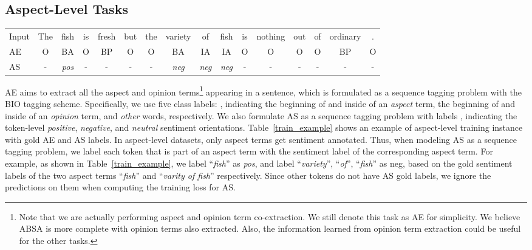 \documentclass[11pt,a4paper]{article}
\begin{document}
\subsection{Aspect-Level Tasks}

\begin{table*}[t!]
\centering
\small
\begin{tabular}{lccccccccccccccc}
\toprule 
Input &The &fish &is &fresh &but &the &variety &of &fish &is &nothing &out &of &ordinary &.\\
AE &O &BA &O &BP &O &O &BA &IA &IA &O &O &O &O &BP &O\\
AS &- &\emph{pos} &- &- &- &- &\emph{neg} &\emph{neg} &\emph{neg} &- &- &- &- &- &-\\
\bottomrule
\end{tabular}
\caption{An aspect-level training instance with gold AE and AS labels.}\label{train_example}
\end{table*}

AE aims to extract all the aspect and opinion terms\footnote{Note that we are actually performing aspect and opinion term co-extraction. We still denote this task as AE for simplicity. 
We believe ABSA is more complete with opinion terms also extracted. Also, the information learned from opinion term extraction could be useful for the other tasks.} 
appearing in a sentence, which is formulated as a sequence tagging problem with the BIO tagging scheme. Specifically, we use five class labels: , indicating the beginning of and inside of an \emph{aspect} term, the beginning of and inside of an \emph{opinion} term, and \emph{other} words, respectively. We also formulate AS as a sequence tagging problem with labels , indicating the token-level \emph{positive}, \emph{negative}, and \emph{neutral} sentiment orientations. Table~\ref{train_example} shows an example of aspect-level training instance with gold AE and AS labels. In aspect-level datasets, only aspect terms get sentiment annotated. Thus, when modeling AS as a sequence tagging problem, we label each token that is part of an aspect term with the sentiment label of the corresponding aspect term. For example, as shown in Table~\ref{train_example}, we label ``\emph{fish}'' as \emph{pos}, and label ``\emph{variety}'', ``\emph{of}'', ``\emph{fish}'' as neg, based on the gold sentiment labels of the two aspect terms ``\emph{fish}'' and ``\emph{varity of fish}'' respectively. Since other tokens do not have AS gold labels, we ignore the predictions on them when computing the training loss for AS.
\end{document}
